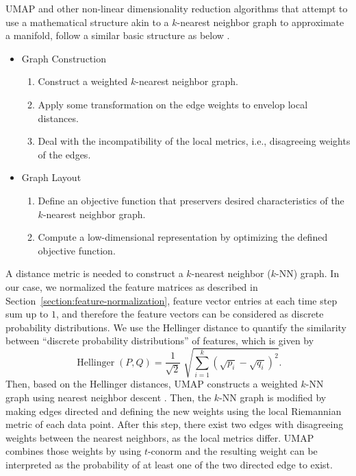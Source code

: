 UMAP and other non-linear dimensionality reduction algorithms that attempt to use a mathematical structure akin to a $k$-nearest neighbor graph to approximate a manifold, follow a similar basic structure as below \citep{mcinnes_umap_2020}.
\begin{itemize} \item Graph Construction \begin{enumerate}
		      \item Construct a weighted $k$-nearest neighbor graph.
		      \item Apply some transformation on the edge weights to envelop local distances.
		      \item Deal with the incompatibility of the local metrics, i.e., disagreeing weights of the edges.
	      \end{enumerate}
	\item Graph Layout
	      \begin{enumerate}
		      \item Define an objective function that preservers desired characteristics of the $k$-nearest neighbor graph.
		      \item Compute a low-dimensional representation by optimizing the defined objective function.
	      \end{enumerate}
\end{itemize}

A distance metric is needed to construct a $k$-nearest neighbor ($k$-NN) graph.
In our case, we normalized the feature matrices as described in Section~\ref{section:feature-normalization}, feature vector entries at each time step sum up to $1$, and therefore the feature vectors  can be considered as discrete probability distributions.
We use the Hellinger distance \citep{hellinger_neue_1909} to quantify the similarity between ``discrete probability distributions'' of features, which is given by
\begin{equation}\label{equation:hellinger-distance}
	\operatorname{Hellinger}(P,Q)={\frac {1}{\sqrt {2}}}\;{\sqrt {\sum _{i=1}^{k}({\sqrt {p_{i}}}-{\sqrt {q_{i}}})^{2}}}.
\end{equation}
Then, based on the Hellinger distances, UMAP constructs a weighted $k$-NN graph using nearest neighbor descent \citep{dong_efficient_2011}.
Then, the $k$-NN graph is modified by making edges directed and defining the new weights using the local Riemannian metric of each data point.
After this step, there exist two edges with disagreeing weights between the nearest neighbors, as the local metrics differ.
UMAP combines those weights by using $t$-conorm and the resulting weight can be interpreted as the probability of at least one of the two directed edge to exist.

